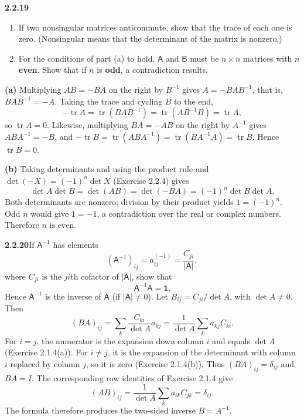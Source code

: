 \par\bigskip
\noindent\textbf{2.2.19}\quad
\begin{enumerate}
\item[(a)] If two nonsingular matrices anticommute, show that the trace of
  each one is zero. (Nonsingular means that the determinant of the matrix is
  nonzero.)
\item[(b)] For the conditions of part (a) to hold, $\mathsf{A}$ and
  $\mathsf{B}$ must be $n\times n$ matrices with $n$ \textbf{even}. Show that
  if $n$ is \textbf{odd}, a contradiction results.
\end{enumerate}
\solution
{}
\textbf{(a)} Multiplying $AB=-BA$ on the right by $B^{-1}$ gives
$A=-BAB^{-1}$, that is, $BAB^{-1}=-A$.
Taking the trace and cycling $B$ to the end,
\[
-\operatorname{tr}A=\operatorname{tr}(BAB^{-1})
=\operatorname{tr}(AB^{-1}B)=\operatorname{tr}A,
\]
so $\operatorname{tr}A=0$. Likewise, multiplying $BA=-AB$ on the
right by $A^{-1}$ gives $ABA^{-1}=-B$, and
$-\operatorname{tr}B=\operatorname{tr}(ABA^{-1})
=\operatorname{tr}(BA^{-1}A)=\operatorname{tr}B$.
Hence $\operatorname{tr}B=0$.

\textbf{(b)} Taking determinants and using the product rule and
$\det(-X)=(-1)^n\det X$ (Exercise 2.2.4) gives
\[
\det A\det B=\det(AB)=\det(-BA)
=(-1)^n\det B\det A.
\]
Both determinants are nonzero; division by their product yields
$1=(-1)^n$. Odd $n$ would give $1=-1$, a contradiction over the
real or complex numbers. Therefore $\boxed{n\text{ is even}}$.

\par\bigskip
\noindent\textbf{2.2.20}\quad If $\mathsf{A}^{-1}$ has elements
\[
(\mathsf{A}^{-1})_{ij}=a_{ij}^{(-1)}=\frac{C_{ji}}{|\mathsf{A}|},
\]
where $C_{ji}$ is the $ji$th cofactor of $|\mathsf{A}|$, show that
\[
\mathsf{A}^{-1}\mathsf{A}=\mathbf{1}.
\]
Hence $\mathsf{A}^{-1}$ is the inverse of $\mathsf{A}$ (if
$|\mathsf{A}|\neq0$).
\solution
Let $B_{ij}=C_{ji}/\det A$, with $\det A\ne0$. Then
\[
(BA)_{ij}=\sum_k\frac{C_{ki}}{\det A}a_{kj}
=\frac1{\det A}\sum_k a_{kj}C_{ki}.
\]
For $i=j$, the numerator is the expansion down column $i$ and equals
$\det A$ (Exercise 2.1.4(a)). For $i\ne j$, it is the expansion of
the determinant with column $i$ replaced by column $j$, so it is zero
(Exercise 2.1.4(b)). Thus
$(BA)_{ij}=\delta_{ij}$ and $BA=I$.
The corresponding row identities of Exercise 2.1.4 give
\[
(AB)_{ij}=\frac1{\det A}\sum_k a_{ik}C_{jk}=\delta_{ij}.
\]
The formula therefore produces the two-sided inverse $B=A^{-1}$.


